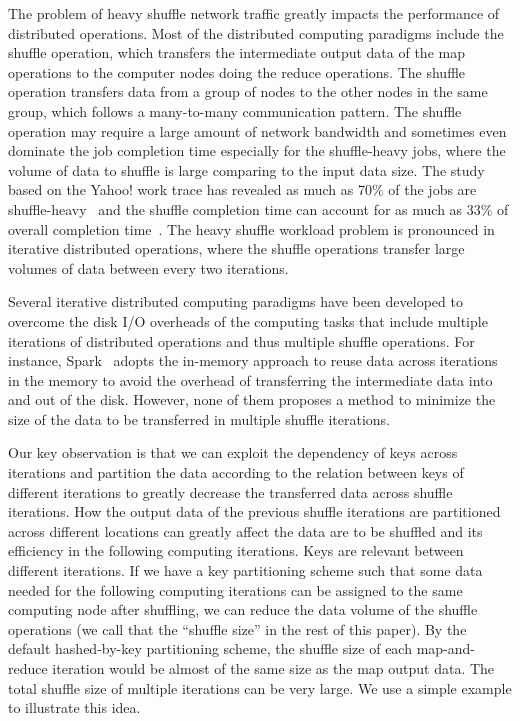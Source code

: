 \documentclass[10pt,journal,compsoc]{IEEEtran}
\newcommand{\blue}[1]{\textcolor{blue}{#1}}
\begin{document}
The problem of heavy shuffle network traffic greatly impacts the performance of distributed operations. 
Most of the distributed computing paradigms include the shuffle
operation, which transfers the intermediate output data of the map
operations to the computer nodes doing the reduce operations.
The shuffle operation transfers data from a group of nodes to the other
nodes in the same group, which follows a many-to-many communication
pattern.
The shuffle operation may require a large amount of network bandwidth
and sometimes even dominate the job completion time especially for the
shuffle-heavy jobs, where the volume of data to shuffle is large
comparing to the input data size.
The study based on the Yahoo! work trace has revealed as much as 70\% of the
jobs are shuffle-heavy~\cite{chen2011case} and the shuffle completion
time can account for as much as 33\% of overall completion time~\cite{chowdhury2011managing, al2010hedera}.
The heavy shuffle workload problem is pronounced in iterative distributed operations, 
where the shuffle operations transfer large volumes of data between every two iterations. 


Several iterative distributed computing paradigms \cite{bu2010haloop,
zaharia2012resilient} have been developed to overcome the disk I/O
overheads of the computing tasks that include multiple iterations of
distributed operations and thus multiple shuffle operations.
For instance, Spark~\cite{zaharia2012resilient} adopts the in-memory approach 
to reuse data across iterations in the memory to avoid the overhead of transferring the intermediate data into and out of the disk. 
However, none of them proposes a method to minimize the size of
the data to be transferred in multiple shuffle iterations.

Our key observation is that we can exploit the dependency of keys across iterations
and partition the data according to the relation between keys of different iterations to greatly decrease 
the transferred data across shuffle iterations.
How the output data of the
previous shuffle iterations are partitioned across different locations
can greatly affect the data are to be
shuffled and its efficiency in the following computing iterations.
Keys are relevant between different iterations.
If we have a key partitioning scheme such that some data needed for the
following computing iterations can be assigned to the same computing
node after shuffling, we can reduce
the data volume of the shuffle operations (we call that the
``shuffle size'' in the rest of this paper). 
By the default hashed-by-key partitioning scheme, the shuffle size of
each map-and-reduce iteration would be almost of the same size as the
map output data. The total shuffle size of multiple iterations
can be very large.
We use a simple example to
illustrate this idea.
\end{document}
